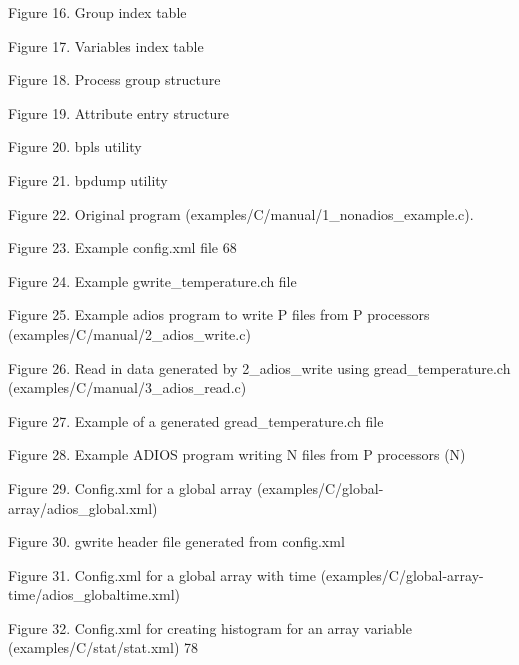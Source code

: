 {\vspace{6pt}
Figure 16. Group index table \pageref{HToc144350176}

\vspace{6pt}
Figure 17. Variables index table \pageref{HToc144350177}

\vspace{6pt}
Figure 18. Process group structure \pageref{HToc144350178}

\vspace{6pt}
Figure 19. Attribute entry structure \pageref{HToc144350179}

\vspace{6pt}
Figure 20. bpls utility \pageref{HToc144350180}

\vspace{6pt}
Figure 21. bpdump utility \pageref{HToc144350181}

\vspace{6pt}
Figure 22. Original program (examples/C/manual/1\_nonadios\_example.c). \pageref{HToc144350182}

\vspace{6pt}
Figure 23. Example config.xml file 68

\vspace{6pt}
Figure 24. Example gwrite\_temperature.ch file \pageref{HToc144350184}

\vspace{6pt}
Figure 25. Example adios program to write P files from P processors (examples/C/manual/2\_adios\_write.c) \pageref{HToc144350185}

\vspace{6pt}
Figure 26. Read in data generated by 2\_adios\_write using gread\_temperature.ch 
(examples/C/manual/3\_adios\_read.c) \pageref{HToc144350186}

\vspace{6pt}
Figure 27. Example of a generated gread\_temperature.ch file \pageref{HToc144350187}

\vspace{6pt}
Figure 28. Example ADIOS program writing N files from P processors (N) \pageref{HToc144350188}

\vspace{6pt}
Figure 29. Config.xml for a global array  (examples/C/global-array/adios\_global.xml) \pageref{HToc144350189}

\vspace{6pt}
Figure 30. gwrite header file generated from config.xml \pageref{}

\vspace{6pt}
Figure 31. Config.xml for a global array with time (examples/C/global-array-time/adios\_globaltime.xml) \pageref{HToc144350191}

\vspace{6pt}
Figure 32. Config.xml for creating histogram for an array variable (examples/C/stat/stat.xml) 78


}


